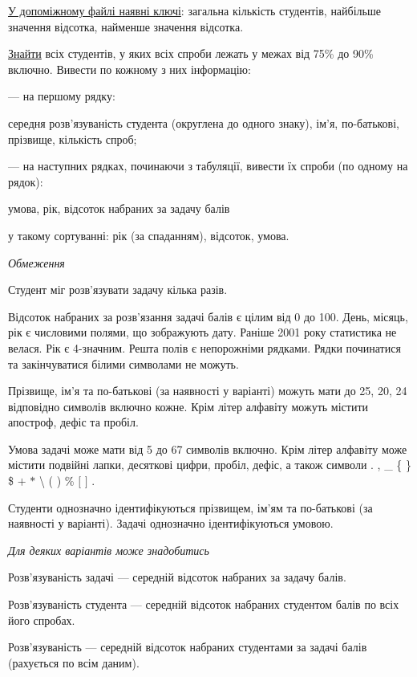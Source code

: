 \documentclass[11pt, ukrainian]{article}
\begin{document}
\underline{У допоміжному файлі наявні ключі}: загальна кількість студентів, найбільше значення відсотка, найменше значення відсотка.

\underline{Знайти} всіх студентів, у яких всіх спроби лежать у межах від 75\% до 90\% включно. Вивести по кожному з них інформацію:\par
{\noindent}--- на першому рядку:\par
середня розв’язуваність студента (округлена до одного знаку), ім’я, по-батькові, прізвище, кількість спроб;

{\noindent}--- на наступних рядках, починаючи з табуляції, вивести їх спроби (по одному на рядок):\par
умова, рік, відсоток набраних за задачу балів

{\noindent}у такому сортуванні: рік (за спаданням), відсоток, умова.


\bigskip\textit{Обмеження}

Студент міг розв’язувати задачу кілька разів.

Відсоток набраних за розв’язання задачі балів є цілим від 0 до 100.
День, місяць, рік є числовими полями, що зображують дату.
Раніше 2001 року статистика не велася. Рік є 4-значним.
Решта полів є непорожніми рядками.
Рядки починатися та закінчуватися білими символами не можуть.

Прізвище, ім’я та по-батькові (за наявності у варіанті) можуть мати до 25, 20, 24 відповідно символів включно кожне. 
Крім літер алфавіту можуть містити апостроф, дефіс та пробіл.

Умова задачі може мати від 5 до 67 символів включно.
Крім літер алфавіту може містити подвійні лапки, десяткові цифри, пробіл, дефіс,
а також символи . , \_ \{ \} \$ $+$ $*$ {\textbackslash} ( ) \% $[$ $]$ .

Студенти однозначно ідентифікуються прізвищем, ім’ям та по-батькові (за наявності у варіанті).
Задачі однозначно ідентифікуються умовою.

\bigskip\textit{Для деяких варіантів може знадобитись}

Розв'язуваність задачі --- середній відсоток набраних за задачу балів.

Розв'язуваність студента --- середній відсоток набраних студентом балів по всіх його спробах.

Розв'язуваність --- середній відсоток набраних студентами за задачі балів (рахується по всім даним).
\end{document}
